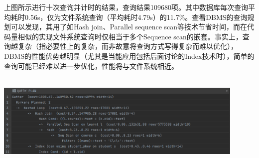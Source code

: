 \par 上图所示进行十次查询并计时的结果，查询结果109680项。其中数据库每次查询平均耗时0.56s，仅为文件系统查询（平均耗时4.79s）的11.7\%。查看DBMS的查询规划可以发现，其用了如Hash join、Parallel sequence scan等技术节省时间，而在代码量相似的实现文件系统查询时仅相当于多个Sequence scan的嵌套。事实上，查询越复杂（指必要性上的复杂，而非故意将查询方式写得复杂而难以优化），DBMS的性能优势越明显（尤其是当能应用包括后面讨论的Index技术时），简单的查询可能已经难以进一步优化，性能将与文件系统相近。\\~\\
\centerline{\includegraphics[width=0.9\textwidth]{dta/queryp}}
